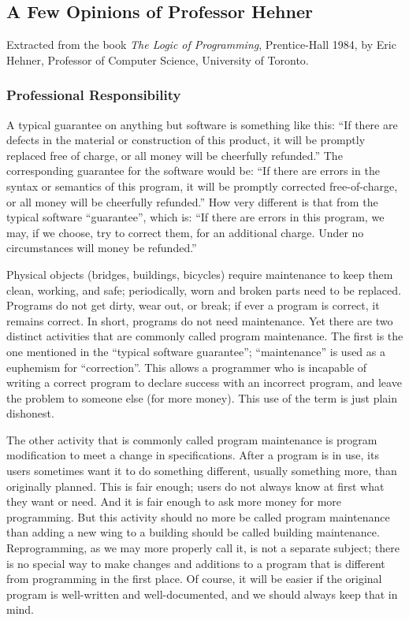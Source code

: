 \documentclass[12pt]{article}
\begin{document}
\pagestyle{empty}

\subsection*{A Few Opinions of Professor Hehner}
{\small Extracted from the book {\sl The Logic of
Programming}, Prentice-Hall 1984, by Eric Hehner, Professor of Computer
Science, University of Toronto.}


\subsubsection*{Professional Responsibility}

A typical guarantee on anything but software is something like
this: ``If there are defects in the material or construction of this
product, it will be promptly replaced free of charge, or all money
will be cheerfully refunded.''  The corresponding guarantee for the
software would be: ``If there are errors in the syntax or semantics of
this program, it will be promptly corrected free-of-charge, or all
money will be cheerfully refunded.''  How very different is that from
the typical software ``guarantee'', which is: ``If there are errors in
this program, we may, if we choose, try to correct them, for an
additional charge.  Under no circumstances will money be refunded.''

Physical objects (bridges, buildings, bicycles) require
maintenance to keep them clean, working, and safe; periodically, worn
and broken parts need to be replaced.  Programs do not get dirty, wear
out, or break; if ever a program is correct, it remains correct.  In
short, programs do not need maintenance.  Yet there are two distinct
activities that are commonly called program maintenance.  The first is
the one mentioned in the ``typical software guarantee'';
``maintenance'' is used as a euphemism for ``correction''.  This
allows a programmer who is incapable of writing a correct program to
declare success with an incorrect program, and leave the problem to
someone else (for more money).  This use of the term is just plain
dishonest.

The other activity that is commonly called program maintenance
is program modification to meet a change in specifications.  After a
program is in use, its users sometimes want it to do something
different, usually something more, than originally planned.  This is
fair enough; users do not always know at first what they want or need.
And it is fair enough to ask more money for more programming.  But
this activity should no more be called program maintenance than adding
a new wing to a building should be called building maintenance.
Reprogramming, as we may more properly call it, is not a separate
subject; there is no special way to make changes and additions to a
program that is different from programming in the first place.  Of
course, it will be easier if the original program is well-written and
well-documented, and we should always keep that in mind.
\end{document}
